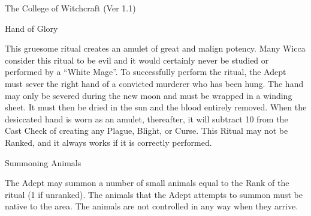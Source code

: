 \begin{Chapter}{The College of Witchcraft (Ver 1.1)}
\begin{ritual}[R-4]{Hand of Glory}
\begin{effects}
This gruesome ritual creates an amulet of great and malign potency.
Many Wicca consider this ritual to be evil and it would certainly
never be studied or performed by a “White Mage”.  To successfully
perform the ritual, the Adept must sever the right hand of a convicted
murderer who has been hung.  The hand may only be severed during the
new moon and must be wrapped in a winding sheet. It must then be dried
in the sun and the blood entirely removed.  When the desiccated hand
is worn as an amulet, thereafter, it will subtract 10 from the Cast
Check of creating any Plague, Blight, or Curse.  This Ritual may not
be Ranked, and it always works if it is correctly performed.
\end{effects}
\end{ritual}

\begin{ritual}[R-5]{Summoning Animals}

\begin{effects}
The Adept may summon a number of small animals equal to the Rank of
the ritual (1 if unranked).  The animals that the Adept attempts to
summon must be native to the area.  The animals are not controlled in
any way when they arrive.
\end{effects}
\end{ritual}

\end{Chapter}
